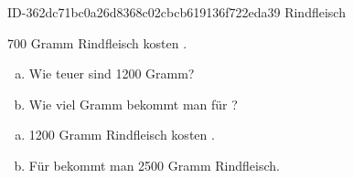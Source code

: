 \begin{exercise}
      {ID-362dc71bc0a26d8368c02cbcb619136f722eda39}
      {Rindfleisch}
  \ifproblem\problem\par
    \num{700} Gramm Rindfleisch kosten .
    \begin{enumerate}[a)]
      \item Wie teuer sind \num{1200} Gramm?
      \item Wie viel Gramm bekommt man für ?
    \end{enumerate}
  \fi
  \ifoutcome\outcome\par
    \begin{enumerate}[a)]
      \item \num{1200} Gramm Rindfleisch kosten .
      \item Für  bekommt man \num{2500} Gramm Rindfleisch.
    \end{enumerate}
  \fi
\end{exercise}
